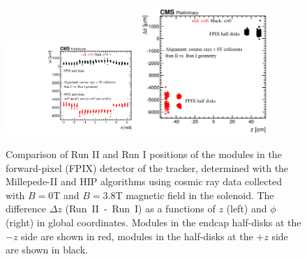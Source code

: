 \begin{figure}[htb]
    \begin{center}
        \includegraphics[width=0.45\textwidth]{../figs/Alignment/AlRes_phi_vs_dz_PXF_1.pdf}\includegraphics[width=0.45\textwidth]{../figs/Alignment/AlRes_z_vs_dz_PXF_1.png}
    \end{center}
    \caption{Comparison of Run II and Run I positions of the modules in the forward-pixel (FPIX) detector of the tracker, determined with the Millepede-II and HIP algorithms using cosmic ray data collected with $B=0$T and $B=3.8$T magnetic field in the solenoid. The difference $\Delta z$ (Run~II~-~Run~I) as a functions of $z$ (left) and $\phi$ (right) in global coordinates. Modules in the endcap half-disks at the $-z$ side are shown in red, modules in the half-disks at the $+z$ side are shown in black.}
    \label{fig:GCP_FPIX}
\end{figure}

